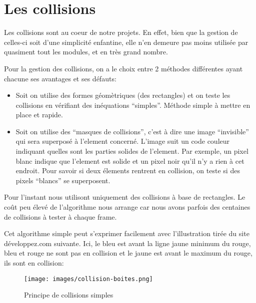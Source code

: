 \documentclass[a4paper, 12pt]{report}
\begin{document}
\section{Les collisions}


Les collisions sont au coeur de notre projets. En effet, bien que la gestion de
celles-ci soit d'une simplicité enfantine, elle n'en demeure pas moins utilisée
par quasiment tout les modules, et en très grand nombre.

Pour la gestion des collisions, on a le choix entre 2 méthodes différentes
ayant chacune ses avantages et ses défauts:
\begin{itemize}
    \item Soit on utilise des formes géomètriques (des rectangles) et on teste les collisions
        en vérifiant des inéquations ``simples''. Méthode simple à mettre en
        place et rapide.
    \item Soit on utilise des ``masques de collisions'', c'est à dire une image
        ``invisible'' qui sera superposé à l'element concerné. L'image suit un
        code couleur indiquant quelles sont les parties solides de l'element.
        Par exemple, un pixel blanc indique que l'element est solide et un
        pixel noir qu'il n'y a rien à cet endroit. Pour savoir si deux élements
        rentrent en collision, on teste si des pixels ``blancs'' se
        superposent.
\end{itemize}


Pour l'instant nous utilisont uniquement des collisions à base de rectangles.
Le coût peu élevé de l'algorithme nous arrange car nous avons parfois des
centaines de collisions à tester à chaque frame.




\noindent Cet algorithme simple peut s'exprimer facilement avec l'illustration tirée du
site développez.com suivante. Ici, le bleu est avant la ligne jaune minimum du
rouge, bleu et rouge ne sont pas en collision et le jaune est avant le maximum
du rouge, ils sont en collision:

\begin{figure}[!ht]
\centering
\texttt{[image: images/collision-boites.png]}
\caption{Principe de collisions simples}
\end{figure}
\end{document}
